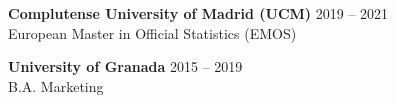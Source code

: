 \vspace{0.5em} \noindent
\textbf{Complutense University of Madrid (UCM)} \hfill 2019 -- 2021 \\
European Master in Official Statistics (EMOS)

\vspace{0.5em} \noindent
\textbf{University of Granada} \hfill 2015 -- 2019 \\
B.A. Marketing







